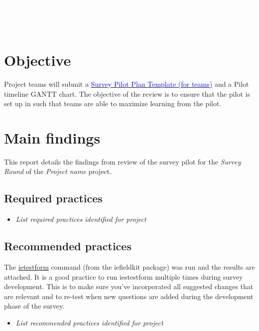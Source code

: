 \documentclass{report}
\newcommand{\titleBox}[1]{
	\begin{tcolorbox}
		[colframe = fontcolor,
		colback = fontcolor,
		sharp corners,
		halign = flush center,
		valign = center,
		height = 0.2\textwidth,
		after skip = 1cm]
		#1
	\end{tcolorbox}
}
\begin{document}
	
	
	\titleBox{
		\textcolor{white}{\Large{Project: Name}} \\
		\textcolor{white}{\Large{Survey: Round}} \\
		\textcolor{white}{\Large{DIME Analytics Survey Pilot Review Checklist}}
	}

		\section*{Objective}
		Project teams will submit a \href{https://www.dropbox.com/scl/fi/px74eyztrn7uv1hsbeoz3/Survey-Pilot-Plan-Template-for-teams.paper?dl=0&rlkey=yaid3m17zzzjpfoconj0zw6fu}{\textcolor{blue}{Survey Pilot Plan Template (for teams)}} and a Pilot timeline GANTT chart. The objective of the review is to ensure that the pilot is set up in such  that teams are able to maximize learning from the pilot. \\





\section*{Main findings}

This report details the findings from review of the survey pilot for the \textit{Survey Round}  of the \textit{Project name} project.

\subsection*{Required practices}
\begin{itemize}
	\item \textit{List required practices identified for project}
\end{itemize} 
\subsection*{Recommended practices}

The \href{https://dimewiki.worldbank.org/Ietestform}{ietestform} command (from the iefieldkit package) was run and the results are attached. It is a good practice to run iestestform multiple times during survey development. This is to make sure you’ve incorporated all suggested changes that are relevant and to re-test when new questions are added during the development phase of the survey.
\begin{itemize}
	\item \textit{List recommended practices identified for project}
\end{itemize}
\end{document}
